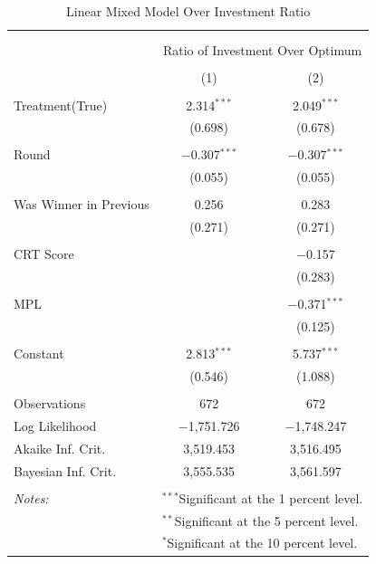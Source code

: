 \begin{table}[!htbp] \centering 
  \caption{Linear Mixed Model Over Investment Ratio} 
  \label{tab:over_invest} 
\begin{tabular}{@{\extracolsep{5pt}}lcc} 
\\[-1.8ex]\hline 
\hline \\[-1.8ex] 
\\[-1.8ex] & \multicolumn{2}{c}{Ratio of Investment Over Optimum} \\ 
\\[-1.8ex] & (1) & (2)\\ 
\hline \\[-1.8ex] 
 Treatment(True) & 2.314$^{***}$ & 2.049$^{***}$ \\ 
  & (0.698) & (0.678) \\ 
  & & \\ 
 Round & $-$0.307$^{***}$ & $-$0.307$^{***}$ \\ 
  & (0.055) & (0.055) \\ 
  & & \\ 
 Was Winner in Previous & 0.256 & 0.283 \\ 
  & (0.271) & (0.271) \\ 
  & & \\ 
 CRT Score &  & $-$0.157 \\ 
  &  & (0.283) \\ 
  & & \\ 
 MPL &  & $-$0.371$^{***}$ \\ 
  &  & (0.125) \\ 
  & & \\ 
 Constant & 2.813$^{***}$ & 5.737$^{***}$ \\ 
  & (0.546) & (1.088) \\ 
  & & \\ 
Observations & 672 & 672 \\ 
Log Likelihood & $-$1,751.726 & $-$1,748.247 \\ 
Akaike Inf. Crit. & 3,519.453 & 3,516.495 \\ 
Bayesian Inf. Crit. & 3,555.535 & 3,561.597 \\ 
\hline \\[-1.8ex] 
\textit{Notes:} & \multicolumn{2}{l}{$^{***}$Significant at the 1 percent level.} \\ 
 & \multicolumn{2}{l}{$^{**}$Significant at the 5 percent level.} \\ 
 & \multicolumn{2}{l}{$^{*}$Significant at the 10 percent level.} \\ 
\end{tabular} 
\end{table} 